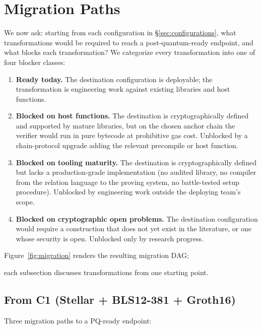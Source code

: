 \section{Migration Paths}
\label{sec:migration}

We now ask: starting from each configuration in
\S\ref{sec:configurations}, what transformations would be required to
reach a post-quantum-ready endpoint, and what blocks each
transformation? We categorize every transformation into one of four
blocker classes:

\begin{enumerate}
  \item[(a)] \textbf{Ready today.} The destination configuration is
    deployable; the transformation is engineering work against
    existing libraries and host functions.
  \item[(b)] \textbf{Blocked on host functions.} The destination is
    cryptographically defined and supported by mature libraries, but
    on the chosen anchor chain the verifier would run in pure
    bytecode at prohibitive gas cost. Unblocked by a chain-protocol
    upgrade adding the relevant precompile or host function.
  \item[(c)] \textbf{Blocked on tooling maturity.} The destination is
    cryptographically defined but lacks a production-grade
    implementation (no audited library, no compiler from the
    relation language to the proving system, no battle-tested setup
    procedure). Unblocked by engineering work outside the deploying
    team's scope.
  \item[(d)] \textbf{Blocked on cryptographic open problems.} The
    destination configuration would require a construction that does
    not yet exist in the literature, or one whose security is open.
    Unblocked only by research progress.
\end{enumerate}

Figure~\ref{fig:migration} renders the resulting migration DAG;

each subsection discusses transformations from one starting point.

\subsection{From C1 (Stellar + BLS12-381 + Groth16)}
\label{sec:mig-c1}

Three migration paths to a PQ-ready endpoint:

